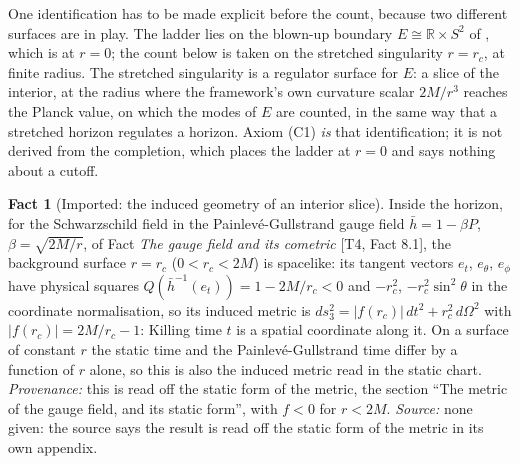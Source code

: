 \documentclass[11pt]{article}
\theoremstyle{definition}
\newtheorem{fact}[theorem]{Fact}
\theoremstyle{plain}
\newcommand{\changedmark}[2]{\marginpar{\raggedright\scriptsize\color{#1}#2}}
\providecommand{\R}{}\renewcommand{\R}{\mathbb{R}}
\providecommand{\hb}{}\renewcommand{\hb}{\bar{h}}
\begin{document}
\label{c:note.singularity.setting-step-6a-iterate-or-stop-2}
One identification has to be made explicit before the count, because two different surfaces are in play. The ladder lies on the blown-up boundary $E \cong \R \times S^{2}$ of \cite[\S 8]{ButlerT4}, which is at $r = 0$; the count below is taken on the stretched singularity $r = r_c$, at finite radius. The stretched singularity is a regulator surface for $E$: a slice of the interior, at the radius where the framework's own curvature scalar $2M/r^{3}$ reaches the Planck value, on which the modes of $E$ are counted, in the same way that a stretched horizon regulates a horizon. Axiom (C1) \emph{is} that identification; it is not derived from the completion, which places the ladder at $r = 0$ and says nothing about a cutoff.

\begin{fact}[Imported: the induced geometry of an interior slice]\label{c:singularity.imported-induced-geometry-interior-slice}
\changedmark{gray}{reworded}
Inside the horizon, for the Schwarzschild field in the Painlev\'e-Gullstrand gauge field $\hb = 1 - \beta P$, $\beta = \sqrt{2M/r}$, of Fact \emph{The gauge field and its cometric} [T4, Fact 8.1], the background surface $r = r_c$ ($0 < r_c < 2M$) is spacelike: its tangent vectors $e_t$, $e_\theta$, $e_\phi$ have physical squares $Q(\hb^{-1}(e_t)) = 1 - 2M/r_c < 0$ and $-r_c^{2}$, $-r_c^{2}\sin^{2}\theta$ in the coordinate normalisation, so its induced metric is $ds_3^{2} = |f(r_c)|\,dt^{2} + r_c^{2}\,d\Omega^{2}$ with $|f(r_c)| = 2M/r_c - 1$: Killing time $t$ is a spatial coordinate along it. On a surface of constant $r$ the static time and the Painlev\'e-Gullstrand time differ by a function of $r$ alone, so this is also the induced metric read in the static chart. \emph{Provenance:} this is read off the static form of the metric, the section ``The metric of the gauge field, and its static form'', with $f < 0$ for $r < 2M$.
\emph{Source:} none given: the source says the result is read off the static form of the metric in its own appendix.
\end{fact}
\end{document}
